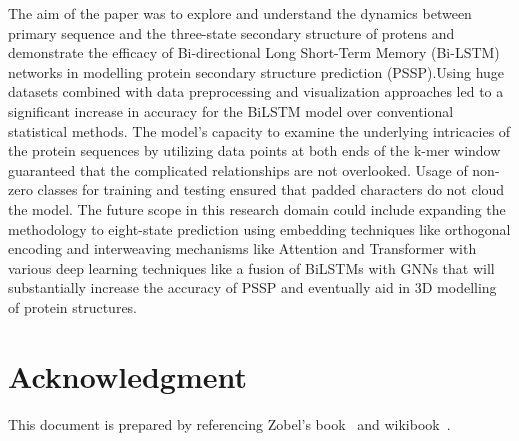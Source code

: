 \documentclass[conference]{IEEEtran}
\begin{document}
The aim of the paper was to explore and understand the dynamics between primary sequence and the three-state secondary structure of protens and demonstrate the efficacy of Bi-directional Long Short-Term Memory (Bi-LSTM) networks in modelling protein secondary structure prediction (PSSP).Using huge datasets combined with data preprocessing and visualization approaches led to a significant increase in accuracy for the BiLSTM model over conventional statistical methods. The model's capacity to examine the underlying intricacies of the protein sequences by utilizing data points at both ends of the k-mer window guaranteed that the complicated relationships are not overlooked. Usage of non-zero classes for training and testing ensured that padded characters do not cloud the model. The future scope in this research domain could include expanding the methodology to eight-state prediction using embedding techniques like orthogonal encoding and interweaving mechanisms like Attention and Transformer with various deep learning techniques like a fusion of BiLSTMs with GNNs that will substantially increase the accuracy of PSSP and eventually aid in 3D modelling of protein structures.
\section*{Acknowledgment}

This document is prepared by referencing Zobel's book~\cite{Zobel14} and wikibook~\cite{wikibook}.
\end{document}
